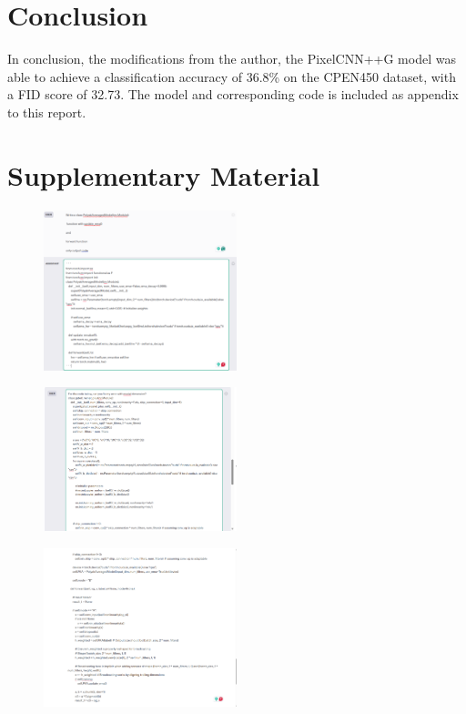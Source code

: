 \documentclass{article}
\begin{document}
\section{Conclusion}

In conclusion, the modifications from the author, the PixelCNN++G model was able to achieve a classification accuracy of 36.8\% on the CPEN450 dataset, with a FID score of 32.73. The model and corresponding code is included as appendix to this report.


\section{Supplementary Material}

\begin{figure}[H]
    \centering
    \includegraphics[width=0.5\textwidth]{report_data/g-1.png}
\end{figure}

\begin{figure}[H]
    \centering
    \includegraphics[width=0.5\textwidth]{report_data/g-2.png}
\end{figure}

\begin{figure}[H]
    \centering
    \includegraphics[width=0.5\textwidth]{report_data/g-3.png}

\end{figure}
\end{document}

